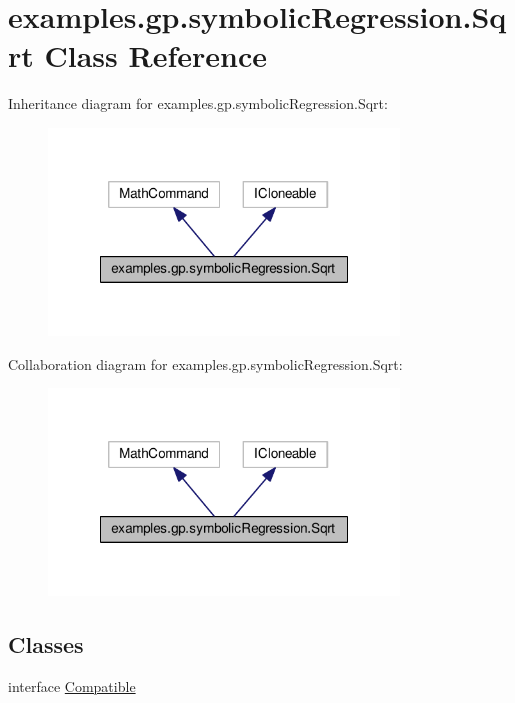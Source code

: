 \hypertarget{classexamples_1_1gp_1_1symbolic_regression_1_1_sqrt}{\section{examples.\-gp.\-symbolic\-Regression.\-Sqrt Class Reference}
\label{classexamples_1_1gp_1_1symbolic_regression_1_1_sqrt}
}


Inheritance diagram for examples.\-gp.\-symbolic\-Regression.\-Sqrt\-:
\nopagebreak
\begin{figure}[H]
\begin{center}
\leavevmode
\includegraphics[width=264pt]{classexamples_1_1gp_1_1symbolic_regression_1_1_sqrt__inherit__graph}
\end{center}
\end{figure}


Collaboration diagram for examples.\-gp.\-symbolic\-Regression.\-Sqrt\-:
\nopagebreak
\begin{figure}[H]
\begin{center}
\leavevmode
\includegraphics[width=264pt]{classexamples_1_1gp_1_1symbolic_regression_1_1_sqrt__coll__graph}
\end{center}
\end{figure}
\subsection*{Classes}
\begin{DoxyCompactItemize}
\item 
interface \hyperlink{interfaceexamples_1_1gp_1_1symbolic_regression_1_1_sqrt_1_1_compatible}{Compatible}
\end{DoxyCompactItemize}
